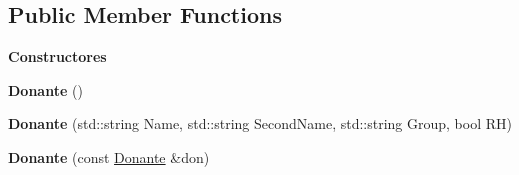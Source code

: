 \subsection*{Public Member Functions}
\begin{Indent}{\bf Constructores}\par
\begin{DoxyCompactItemize}
\item 
{\bfseries Donante} ()\hypertarget{classed_1_1Donante_a2847e02d165f0850b1917b739e2ef68a}{}\label{classed_1_1Donante_a2847e02d165f0850b1917b739e2ef68a}

\item 
{\bfseries Donante} (std\+::string Name, std\+::string Second\+Name, std\+::string Group, bool RH)\hypertarget{classed_1_1Donante_adbdccfbaed5d68439b52b277bb6ea6d3}{}\label{classed_1_1Donante_adbdccfbaed5d68439b52b277bb6ea6d3}

\item 
{\bfseries Donante} (const \hyperlink{classed_1_1Donante}{Donante} \&don)\hypertarget{classed_1_1Donante_ac2f8da906fe62462be028e2c7ec4ba48}{}\label{classed_1_1Donante_ac2f8da906fe62462be028e2c7ec4ba48}

\end{DoxyCompactItemize}
\end{Indent}
